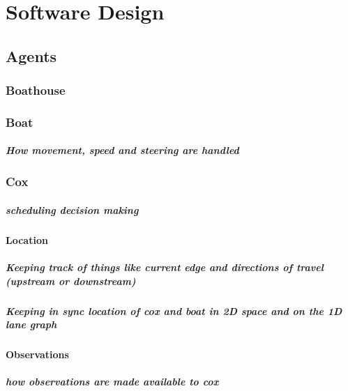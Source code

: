 \chapter{Software Design}

\section{Agents}
  \subsection{Boathouse}
  
  \subsection{Boat}
    \paragraph{How movement, speed and steering are handled}
    
  \subsection{Cox}
    \paragraph{scheduling decision making}
    \subsubsection{Location}
      \paragraph{Keeping track of things like current edge and directions of travel (upstream or downstream)}
      \paragraph{Keeping in sync location of cox and boat in 2D space and on the 1D lane graph}
    \subsubsection{Observations}
      \paragraph{how observations are made available to cox}
    
